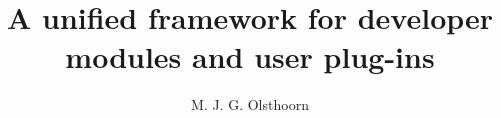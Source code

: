 \documentclass[whitelogo]{tudelft-report}
\begin{document}
\frontmatter


\title[tudelft-white]{\Huge{A unified framework for developer modules and user plug-ins}}
\subtitle[tudelft-black]{}
\author[tudelft-white]{\huge{M. J. G. Olsthoorn}}
\makecover[split]








\tableofcontents

\mainmatter



\appendix

%


\end{document}

